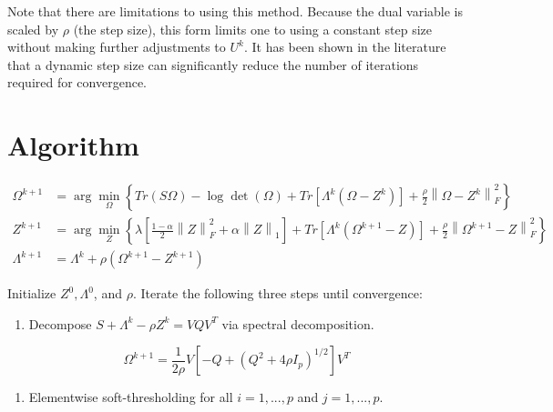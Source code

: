 \documentclass[11pt,]{book}
\providecommand{\tightlist}{%
  \setlength{\itemsep}{0pt}\setlength{\parskip}{0pt}}
\theoremstyle{definition}
\theoremstyle{definition}
\theoremstyle{definition}
\theoremstyle{remark}
\begin{document}
Note that there are limitations to using this method. Because the dual
variable is scaled by \(\rho\) (the step size), this form limits one to
using a constant step size without making further adjustments to
\(U^{k}\). It has been shown in the literature that a dynamic step size
can significantly reduce the number of iterations required for
convergence.

\vspace{1cm}

\hypertarget{algorithm}{%
\section{Algorithm}\label{algorithm}}

\begin{align*}
  \Omega^{k + 1} &= \arg\min_{\Omega}\left\{ Tr\left(S\Omega\right) - \log\det\left(\Omega\right) + Tr\left[\Lambda^{k}\left(\Omega - Z^{k}\right)\right] + \frac{\rho}{2}\left\| \Omega - Z^{k} \right\|_{F}^{2} \right\} \\
  Z^{k + 1} &= \arg\min_{Z}\left\{ \lambda\left[ \frac{1 - \alpha}{2}\left\| Z \right\|_{F}^{2} + \alpha\left\| Z \right\|_{1} \right] + Tr\left[\Lambda^{k}\left(\Omega^{k + 1} - Z\right)\right] + \frac{\rho}{2}\left\| \Omega^{k + 1} - Z \right\|_{F}^{2} \right\} \\
  \Lambda^{k + 1} &= \Lambda^{k} + \rho\left( \Omega^{k + 1} - Z^{k + 1} \right)
\end{align*}

\vspace{1cm}

Initialize \(Z^{0}, \Lambda^{0}\), and \(\rho\). Iterate the following
three steps until convergence:

\begin{enumerate}
\def\labelenumi{\arabic{enumi}.}
\tightlist
\item
  Decompose \(S + \Lambda^{k} - \rho Z^{k} = VQV^{T}\) via spectral
  decomposition.
\end{enumerate}

\[ \Omega^{k + 1} = \frac{1}{2\rho}V\left[ -Q + \left( Q^{2} + 4\rho I_{p} \right)^{1/2} \right]V^{T} \]

\begin{enumerate}
\def\labelenumi{\arabic{enumi}.}
\setcounter{enumi}{1}
\tightlist
\item
  Elementwise soft-thresholding for all \(i = 1,..., p\) and
  \(j = 1,..., p\).
\end{enumerate}
\end{document}
